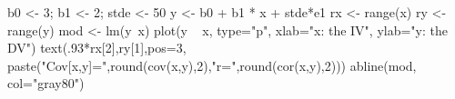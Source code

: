 \begin{Schunk}
\begin{Sinput}
 b0 <- 3; b1 <- 2; stde <- 50
 y <- b0 + b1 * x + stde*e1
 rx <- range(x)
 ry <- range(y)
 mod <- lm(y~x)
 plot(y ~ x, type="p", xlab="x: the IV", ylab="y: the DV")
 text(.93*rx[2],ry[1],pos=3, paste("Cov[x,y]=",round(cov(x,y),2),"\n r=",round(cor(x,y),2)))
 abline(mod, col="gray80")
\end{Sinput}
\end{Schunk}
